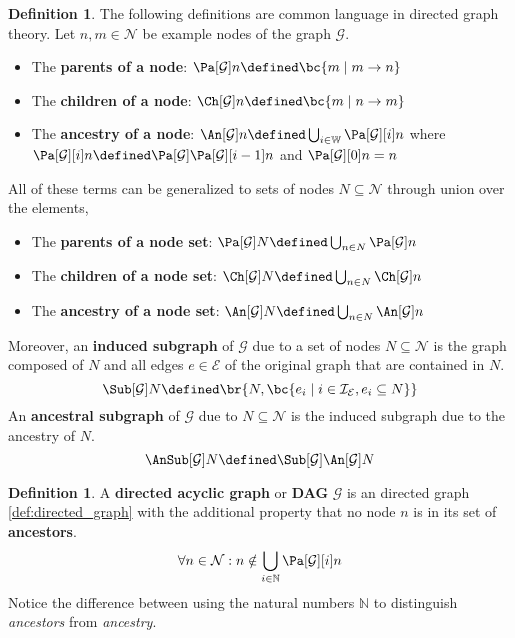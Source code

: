 \documentclass[aps, 10pt, english, twoside, pra, longbibliography]{revtex4-1}
\theoremstyle{plain}
\theoremstyle{definition}
\newtheorem{definition}[theorem]{Definition}
\theoremstyle{remark}
\newcommand{\graph}{\mathcal{G}}
\newcommand{\nodes}{\mathcal{N}}
\newcommand{\edges}{\mathcal{E}}
\newcommand{\ind}{\mathcal{I}}
\newcommand{\term}[1]{\textcolor{Mahogany}{\textbf{#1}}}
\begin{document}
    \begin{definition}
        \label{def:graph_terms}
        The following definitions are common language in directed graph theory. Let $n, m \in \nodes$ be example nodes of the graph $\graph$.
        \begin{itemize}
            \item The \term{parents of a node}: $\Pa[\graph]{n} \defined \bc{m \mid m \to n}$
            \item The \term{children of a node}: $\Ch[\graph]{n} \defined \bc{m \mid n \to m}$
            \item The \term{ancestry of a node}: $\An[\graph]{n} \defined \bigcup_{i\in\mathbb{W}} \Pa[\graph][i]{n}$ where $\Pa[\graph][i]{n} \defined \Pa[\graph]{\Pa[\graph][i-1]{n}}$ and $\Pa[\graph][0]{n} = n$
        \end{itemize}
        All of these terms can be generalized to sets of nodes $N \subseteq \nodes$ through union over the elements,
        \begin{itemize}
            \item The \term{parents of a node set}: $\Pa[\graph]{N} \defined \bigcup_{n\in N}\Pa[\graph]{n}$
            \item The \term{children of a node set}: $\Ch[\graph]{N} \defined \bigcup_{n\in N}\Ch[\graph]{n}$
            \item The \term{ancestry of a node set}: $\An[\graph]{N} \defined \bigcup_{n\in N}\An[\graph]{n}$
        \end{itemize}
        Moreover, an \term{induced subgraph} of $\graph$ due to a set of nodes $N \subseteq \nodes$ is the graph composed of $N$ and all edges $e \in \edges$ of the original graph that are contained in $N$.
        \[ \Sub[\graph]{N} \defined \br{N, \bc{e_i \mid i \in \ind_\edges, e_i \subseteq N}}\]
        An \term{ancestral subgraph} of $\graph$ due to $N \subseteq \nodes$ is the induced subgraph due to the ancestry of $N$.
        \[ \AnSub[\graph]{N} \defined \Sub[\graph]{\An[\graph]{N}} \]
    \end{definition}

    \begin{definition}
        \label{def:dag}
        A \term{directed acyclic graph} or \term{DAG} $\graph$ is an directed graph \cref{def:directed_graph} with the additional property that no node $n$ is in its set of \term{ancestors}.
        \[ \forall n \in \nodes : n \notin \bigcup_{i\in\mathbb{N}} \Pa[\graph][i]{n}\]
        Notice the difference between using the natural numbers $\mathbb{N}$ to distinguish \textit{ancestors} from \textit{ancestry}.
    \end{definition}
\end{document}
